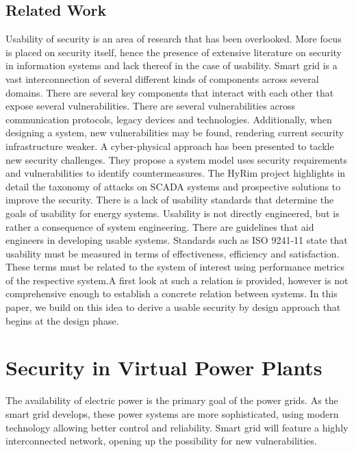 \subsection{Related Work}
Usability of security is an area of research that has been overlooked. More focus is placed on security itself, hence the presence of extensive literature on security in information systems and lack thereof in the case of usability. Smart grid is a vast interconnection of several different kinds of components across several domains. There are several key components that interact with each other that expose several vulnerabilities\cite{liu2012cyber}. There are several vulnerabilities across communication protocols, legacy devices and technologies. Additionally, when designing a system, new vulnerabilities may be found, rendering current security infrastructure weaker. A cyber-physical approach\cite{mo2012cyber} has been presented to tackle new security challenges. They propose a system model uses security requirements and vulnerabilities to identify countermeasures. The HyRim project\cite{scada2014attack} highlights in detail the taxonomy of attacks on SCADA systems and prospective solutions to improve the security.
\newline
There is a lack of usability standards that determine the goals of usability for energy systems. Usability is not directly engineered, but is rather a consequence of system engineering. There are guidelines that aid engineers in developing usable systems\cite{nurse2011guidelines}. Standards such as ISO 9241-11\cite{bevan2015iso} state that usability must be measured in terms of effectiveness, efficiency and satisfaction. These terms must be related to the system of interest using performance metrics of the respective system.A first look at such a relation is provided\cite{kainda2010security}, however is not comprehensive enough to establish a concrete relation between systems. In this paper, we build on this idea to derive a usable security by design approach that begins at the design phase\cite{nielsen1992usability}.

\section{Security in Virtual Power Plants}

The availability of electric power is the primary goal of the power grids. As the smart grid develops, these power systems are more sophisticated, using modern technology allowing better control and reliability. Smart grid will feature a highly interconnected network, opening up the possibility for new vulnerabilities.\\


